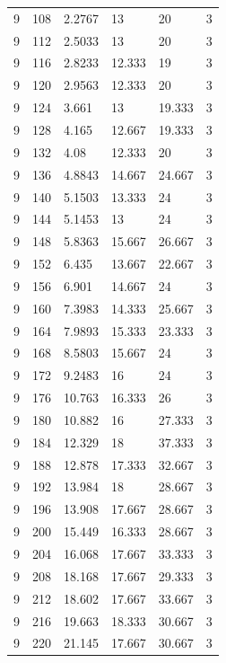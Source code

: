 \begin{tabular}{|p{0.6cm}|p{0.5cm}|p{1.15cm}|p{1cm}|p{1cm}|p{0.7cm}|}
9 & 108 & 2.2767 & 13 & 20 & 3 \\
9 & 112 & 2.5033 & 13 & 20 & 3 \\
9 & 116 & 2.8233 & 12.333 & 19 & 3 \\
9 & 120 & 2.9563 & 12.333 & 20 & 3 \\
9 & 124 & 3.661 & 13 & 19.333 & 3 \\
9 & 128 & 4.165 & 12.667 & 19.333 & 3 \\
9 & 132 & 4.08 & 12.333 & 20 & 3 \\
9 & 136 & 4.8843 & 14.667 & 24.667 & 3 \\
9 & 140 & 5.1503 & 13.333 & 24 & 3 \\
9 & 144 & 5.1453 & 13 & 24 & 3 \\
9 & 148 & 5.8363 & 15.667 & 26.667 & 3 \\
9 & 152 & 6.435 & 13.667 & 22.667 & 3 \\
9 & 156 & 6.901 & 14.667 & 24 & 3 \\
9 & 160 & 7.3983 & 14.333 & 25.667 & 3 \\
9 & 164 & 7.9893 & 15.333 & 23.333 & 3 \\
9 & 168 & 8.5803 & 15.667 & 24 & 3 \\
9 & 172 & 9.2483 & 16 & 24 & 3 \\
9 & 176 & 10.763 & 16.333 & 26 & 3 \\
9 & 180 & 10.882 & 16 & 27.333 & 3 \\
9 & 184 & 12.329 & 18 & 37.333 & 3 \\
9 & 188 & 12.878 & 17.333 & 32.667 & 3 \\
9 & 192 & 13.984 & 18 & 28.667 & 3 \\
9 & 196 & 13.908 & 17.667 & 28.667 & 3 \\
9 & 200 & 15.449 & 16.333 & 28.667 & 3 \\
9 & 204 & 16.068 & 17.667 & 33.333 & 3 \\
9 & 208 & 18.168 & 17.667 & 29.333 & 3 \\
9 & 212 & 18.602 & 17.667 & 33.667 & 3 \\
9 & 216 & 19.663 & 18.333 & 30.667 & 3 \\
9 & 220 & 21.145 & 17.667 & 30.667 & 3 \\
\bottomrule
\end{tabular}
